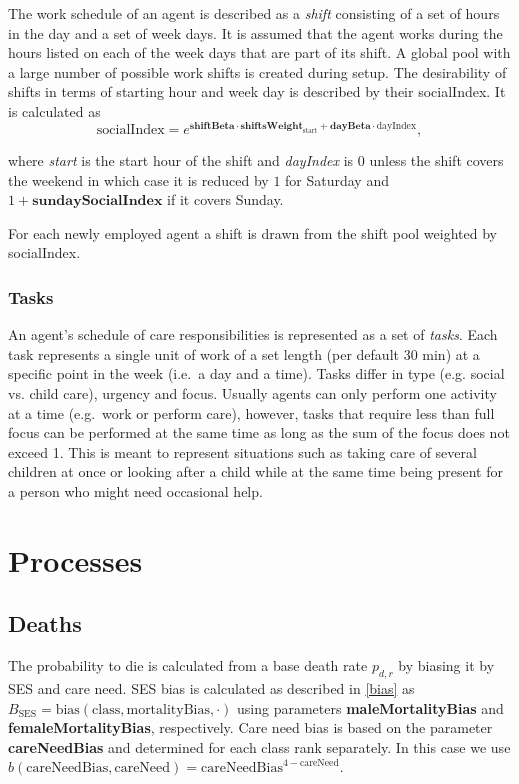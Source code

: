 \documentclass{article}
\newcommand{\marginnote}[1]{\protect\marginpar{\small\texttt{#1}}}
\begin{document}
The work schedule of an agent is described as a \emph{shift} consisting of a set of hours in the day and a set of week days. It is assumed that the agent works during the hours listed on each of the week days that are part of its shift. A global pool with a large number of possible work shifts is created during setup. The desirability of shifts in terms of starting hour and week day is described by their \textsf{socialIndex}. It is calculated as 
\[
\textrm{socialIndex} = e^{\textbf{shiftBeta} \cdot \textbf{shiftsWeight}_\textrm{start} + \textbf{dayBeta} \cdot \textrm{dayIndex}},
\]

where \textit{start} is the start hour of the shift and \textit{dayIndex} is $0$ unless the shift covers the weekend in which case it is reduced by $1$ for Saturday and $1+\textbf{sundaySocialIndex}$ if it covers Sunday.

For each newly employed agent a shift is drawn from the shift pool weighted by \textsf{socialIndex}.

\subsubsection*{Tasks}\label{tasks}

An agent's schedule of care responsibilities is represented as a set of \emph{tasks}. Each task represents a single unit of work of a set length (per default 30 min) at a specific point in the week (i.e.~a day and a time). Tasks differ in type (e.g. social vs. child care), urgency and focus. Usually agents can only perform one activity at a time (e.g.~work or perform care), however, tasks that require less than full focus can be performed at the same time as long as the sum of the focus does not exceed 1. This is meant to represent situations such as taking care of several children at once or looking after a child while at the same time being present for a person who might need occasional help.

\section{Processes}

\subsection{Deaths \marginnote{Deaths.jl}}

The probability to die is calculated from a base death rate $p_{d,r}$ by biasing it by SES and care need. SES bias is calculated as described in \ref{bias} as $B_\textrm{SES}=\textrm{bias}(\textrm{class}, \textrm{mortalityBias}, \cdot)$ using parameters \textbf{maleMortalityBias} and \textbf{femaleMortalityBias}, respectively. Care need bias is based on the parameter \textbf{careNeedBias} and determined for each class rank separately. In this case we use $b(\textrm{careNeedBias}, \textrm{careNeed}) = \textrm{careNeedBias}^{4-\textrm{careNeed}}$.
\end{document}
